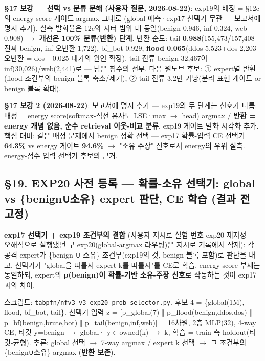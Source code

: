 \textbf{§17 보강 — 선택 vs 분류 분해 (사용자 질문, 2026-08-22)}: exp19의 배정 =\allowbreak{} §12c의 energy-score 게이트 argmax 그대로 (global 예측·exp17 선택기 무관 — 보고서에 명시 추가). 실측 발화율은 12c와 지터 범위 내 동일(benign 0.946, inf 0.324, web 0.908)  \ensuremath{\rightarrow}  \textbf{개선은 100\% 분류(반환) 단계}. 반환 순도: tail \textbf{0.988}(155,473/\allowbreak{}157,408 진짜 benign, inf 오반환 1,722), bf\_\allowbreak{}bot 0.929, \textbf{flood 0.065}(ddos 5,523+\allowbreak{}dos 2,203 오반환 =\allowbreak{} dos −0.025 대가의 원인 확정). tail 잔류 benign 32,467이 inf(30,026)/\allowbreak{}web(2,441)로 — 남은 침수의 전부. 다음 원노브 후보: ① expert별 반환(flood 조건부의 benign 블록 축소/\allowbreak{}제거), ② tail 잔류 3.2만 겨냥(분리-표현 게이트 or benign 블록 확대).

\textbf{§17 보강 2 (2026-08-22)}: 보고서에 명시 추가 — exp19의 두 단계는 신호가 다름: 배정 =\allowbreak{} energy score(softmax-직전 유사도 LSE·max  \ensuremath{\rightarrow}  head) argmax /\allowbreak{} \textbf{반환 =\allowbreak{} energy 개념 없음, 순수 retrieval 이웃-비교 분류}. exp19 게이트 발화 시각화 추가. 핵심 대비: 같은 배정 문제에서 benign 정확 선택 — exp17 확률-입력 CE 선택기 \textbf{64.3\%} vs energy 게이트 \textbf{94.6\%}  \ensuremath{\rightarrow}  "소유 주장" 신호로서 energy의 우위 실측. energy-점수 입력 선택기 후보의 근거.

\subsection{§19. EXP20 사전 등록 — 확률-소유 선택기: global vs \{benign∪소유\} expert 판단, CE 학습 (결과 전 고정)}
\textbf{exp17 선택기 +\allowbreak{} exp19 조건부의 결합} (사용자 지시로 실험 번호 exp20 재지정 — 오해석으로 실행됐던 구 exp20(global-argmax 라우팅)은 지시로 기록에서 삭제): 각 공격 expert가 \{benign ∪ 소유\} 조건부(exp19의 것, benign 블록 포함)로 판단을 내고, 선택기가 "global을 따를지 expert k를 따를지"를 CE로 학습. energy score 부재는 동일하되, expert의 \textbf{p(benign)이 확률-기반 소유-주장 신호}로 작동하는 것이 exp17과의 차이.

스크립트: \texttt{tabpfn/\allowbreak{}\allowbreak{}n\allowbreak{}fv3\_\allowbreak{}\allowbreak{}v3\_\allowbreak{}\allowbreak{}e\allowbreak{}xp20\_\allowbreak{}\allowbreak{}pro\allowbreak{}b\_\allowbreak{}\allowbreak{}select\allowbreak{}or.\allowbreak{}py}. 후보 4 =\allowbreak{} \{global(1M), flood, bf\_\allowbreak{}bot, tail\}. 선택기 입력 z =\allowbreak{} [p\_\allowbreak{}global(7) ‖ p\_\allowbreak{}flood(benign,ddos,dos) ‖ p\_\allowbreak{}bf(benign,brute,bot) ‖ p\_\allowbreak{}tail(benign,inf,web)] =\allowbreak{} 16차원, 2층 MLP(32), 4-way CE, 타깃 y=\allowbreak{}benign \ensuremath{\rightarrow} global· y\ensuremath{\in}owned(k) \ensuremath{\rightarrow} k, 학습 =\allowbreak{} train-측 holdout(타깃-균형). 추론: global 선택 \ensuremath{\rightarrow} 7-way argmax /\allowbreak{} expert k 선택 \ensuremath{\rightarrow} 그 조건부의 \{benign∪소유\} argmax (\textbf{반환 보존}).

